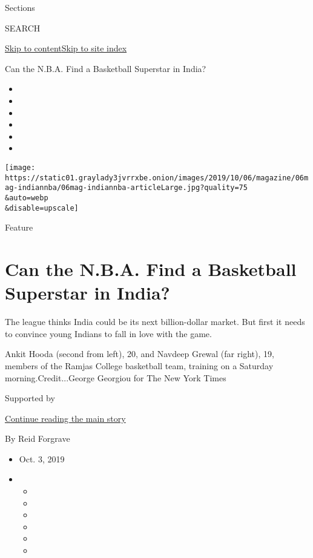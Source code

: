Sections

SEARCH

\protect\hyperlink{site-content}{Skip to
content}\protect\hyperlink{site-index}{Skip to site index}

Can the N.B.A. Find a Basketball Superstar in India?

\begin{itemize}
\item
\item
\item
\item
\item
\item
\end{itemize}

\texttt{[image: https://static01.graylady3jvrrxbe.onion/images/2019/10/06/magazine/06mag-indiannba/06mag-indiannba-articleLarge.jpg?quality=75\\\&auto=webp\\\&disable=upscale]}

Feature

\hypertarget{can-the-nba-find-a-basketball-superstar-in-india}{%
\section{Can the N.B.A. Find a Basketball Superstar in
India?}\label{can-the-nba-find-a-basketball-superstar-in-india}}

The league thinks India could be its next billion-dollar market. But
first it needs to convince young Indians to fall in love with the game.

Ankit Hooda (second from left), 20, and Navdeep Grewal (far right), 19,
members of the Ramjas College basketball team, training on a Saturday
morning.Credit...George Georgiou for The New York Times

Supported by

\protect\hyperlink{after-sponsor}{Continue reading the main story}

By Reid Forgrave

\begin{itemize}
\item
  Oct. 3, 2019
\item
  \begin{itemize}
  \item
  \item
  \item
  \item
  \item
  \item
  \end{itemize}
\end{itemize}

